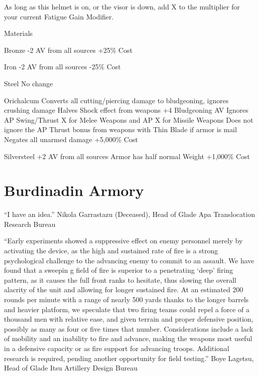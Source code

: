 \documentclass[oneside,11pt,english]{book}
\begin{document}
As long as this helmet is on, or the visor is down, add X to the multiplier for your current Fatigue 
Gain Modifier.

Materials


Bronze
-2 AV from all sources
+25\% Cost

Iron
-2 AV from all sources
-25\% Cost

Steel
No change

Orichalcum 
Converts all cutting/piercing damage to bludgeoning, ignores crushing damage
Halves Shock effect from weapons
+4 Bludgeoning AV
Ignores AP Swing/Thrust X for Melee Weapons and AP X for Missile Weapons
Does not ignore the AP Thrust bonus from weapons with Thin Blade if armor is mail
Negates all unarmed damage
+5,000\% Cost

Silversteel
+2 AV from all sources
Armor has half normal Weight 
+1,000\% Cost
\chapter{Burdinadin Armory}
“I have an idea.” 
Nikola Garrastazu (Deceased), Head of Glade Apa Translocation Research Bureau 

 

“Early experiments showed a suppressive effect on enemy personnel merely by activating the device, as the high and sustained 
rate of fire is a strong psychological challenge to the advancing enemy to commit to an assault. We have found that a sweepin g 
field of fire is superior to a penetrating ‘deep’ firing pattern, as it causes the full front ranks to hesitate, thus slowing the overall 
alacrity of the unit and allowing for longer sustained fire. At an estimated 200 rounds per minute with a range of nearly 500 
yards thanks to the longer barrels and heavier platform, we speculate that two firing teams could repel a force of a thousand men 
with relative ease, and given terrain and proper defensive position, possibly as many as four or five times that number. 
Considerations include a lack of mobility and an inability to fire and advance, making the weapons most useful in a defensive 
capacity or as fire support for advancing troops. Additional research is required, pending another opportunity for field testing.” 
Boye Lagetsu, Head of Glade Itsu Artillery Design Bureau 

 
\end{document}
